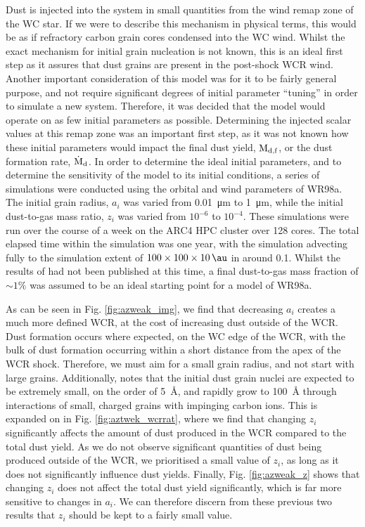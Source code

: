 Dust is injected into the system in small quantities from the wind remap zone of the WC star.
If we were to describe this mechanism in physical terms, this would be as if refractory carbon grain cores condensed into the WC wind.
Whilst the exact mechanism for initial grain nucleation is not known, this is an ideal first step as it assures that dust grains are present in the post-shock WCR wind.
Another important consideration of this model was for it to be fairly general purpose, and not require significant degrees of initial parameter ``tuning'' in order to simulate a new system.
Therefore, it was decided that the model would operate on as few initial parameters as possible.
Determining the injected scalar values at this remap zone was an important first step, as it was not known how these initial parameters would impact the final dust yield, $\text{M}_\text{d,f}$, or the dust formation rate, $\dot{\text{M}}_\text{d}$. 
In order to determine the ideal initial parameters, and to determine the sensitivity of the model to its initial conditions, a series of simulations were conducted using the orbital and wind parameters of WR98a.
The initial grain radius, $a_i$ was varied from \SI{0.01}{\micro\metre} to \SI{1}{\micro\metre}, while the initial dust-to-gas mass ratio, $z_i$ was varied from $10^{-6}$ to $10^{-4}$.
These simulations were run over the course of a week on the ARC4 HPC cluster over 128 cores.
The total elapsed time within the simulation was one year, with the simulation advecting fully to the simulation extent of $100\times 100 \times 10 \, \si{\au}$ in around \SI{0.1}{\year}.
Whilst the results of \textcite{lauRevealingEfficientDust2021} had not been published at this time, a final dust-to-gas mass fraction of $\sim 1\%$ was assumed to be an ideal starting point for a model of WR98a.


As can be seen in Fig. \ref{fig:azweak_img}, we find that decreasing $a_i$ creates a much more defined WCR, at the cost of increasing dust outside of the WCR.
Dust formation occurs where expected, on the WC edge of the WCR, with the bulk of dust formation occurring within a short distance from the apex of the WCR shock.
Therefore, we must aim for a small grain radius, and not start with large grains.
Additionally, \textcite{zubkoPhysicalModelDust1998a} notes that the initial dust grain nuclei are expected to be extremely small, on the order of \SI{5}{\angstrom}, and rapidly grow to \SI{100}{\angstrom} through interactions of small, charged grains with impinging carbon ions.
This is expanded on in Fig. \ref{fig:aztwek_wcrrat}, where we find that changing $z_i$ significantly affects the amount of dust produced in the WCR compared to the total dust yield.
As we do not observe significant quantities of dust being produced outside of the WCR, we prioritised a small value of $z_i$, as long as it does not significantly influence dust yields.
Finally, Fig. \ref{fig:azweak_z} shows that changing $z_i$ does not affect the total dust yield significantly, which is far more sensitive to changes in $a_i$.
We can therefore discern from these previous two results that $z_i$ should be kept to a fairly small value.

